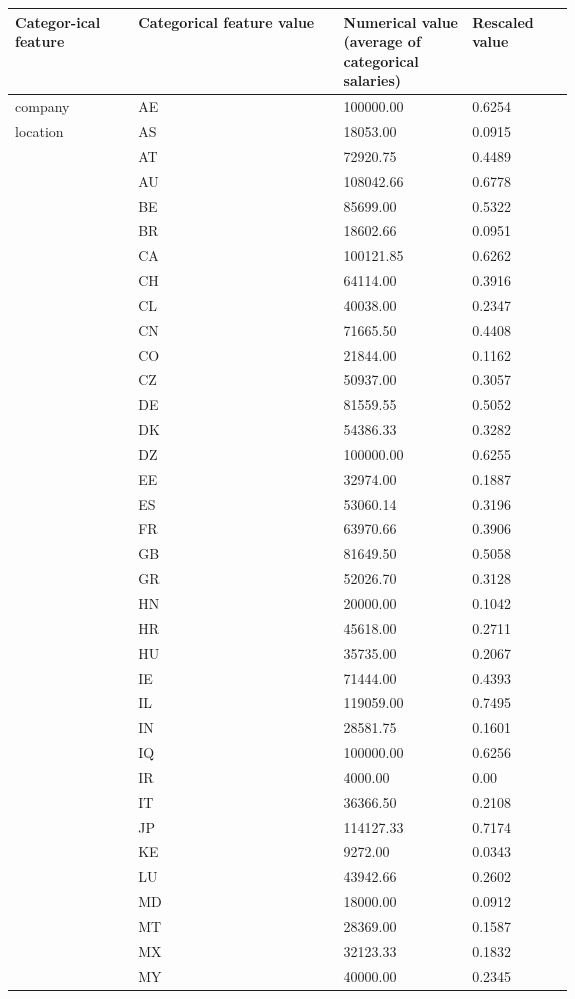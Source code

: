 \documentclass[11pt,a4paper]{article}
\begin{document}
\begin{table}
\centering
\begin{tabular}{p{0.15\linewidth}|p{0.25\linewidth}|p{0.15\linewidth}|p{0.10\linewidth}} \hline
\textbf{Categor-ical feature}&\textbf{Categorical feature value}&\textbf{Numerical value} (average of categorical salaries)&\textbf{Rescaled value}\\ \hline
company&AE&100000.00&0.6254\\
location&AS&18053.00&0.0915\\
&AT&72920.75&0.4489\\
&AU&108042.66&0.6778\\
&BE&85699.00&0.5322\\
&BR&18602.66&0.0951\\
&CA&100121.85&0.6262\\
&CH&64114.00&0.3916\\
&CL&40038.00&0.2347\\
&CN&71665.50&0.4408\\
&CO&21844.00&0.1162\\
&CZ&50937.00&0.3057\\
&DE&81559.55&0.5052\\
&DK&54386.33&0.3282\\
&DZ&100000.00&0.6255\\
&EE&32974.00&0.1887\\
&ES&53060.14&0.3196\\
&FR&63970.66&0.3906\\
&GB&81649.50&0.5058\\
&GR&52026.70&0.3128\\
&HN&20000.00&0.1042\\
&HR&45618.00&0.2711\\
&HU&35735.00&0.2067\\
&IE&71444.00&0.4393\\
&IL&119059.00&0.7495\\
&IN&28581.75&0.1601\\
&IQ&100000.00&0.6256\\
&IR&4000.00&0.00\\
&IT&36366.50&0.2108\\
&JP&114127.33&0.7174\\
&KE&9272.00&0.0343\\
&LU&43942.66&0.2602\\
&MD&18000.00&0.0912\\
&MT&28369.00&0.1587\\
&MX&32123.33&0.1832\\
&MY&40000.00&0.2345\\

\end{tabular}
\end{table}
\end{document}
